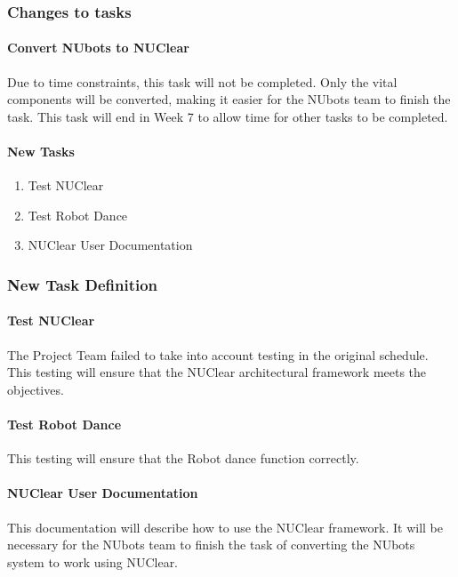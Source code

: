 \documentclass[english,12pt]{scrartcl}
\begin{document}
			\subsubsection{Changes to tasks}
				\paragraph{Convert NUbots to NUClear}
					Due to time constraints, this task will not be completed. Only the vital components will be converted, making it easier for the NUbots team to finish the task.
					This task will end in Week 7 to allow time for other tasks to be completed. 
				\paragraph{New Tasks}
					\begin{enumerate}
						\item Test NUClear
						\item Test Robot Dance
						\item NUClear User Documentation
					\end{enumerate}
			\subsubsection{New Task Definition}
				\paragraph{Test NUClear}
					The Project Team failed to take into account testing in the original schedule. This testing will ensure that the NUClear architectural framework meets the objectives.
				\paragraph{Test Robot Dance}
					This testing will ensure that the Robot dance function correctly.
				\paragraph{NUClear User Documentation}
					This documentation will describe how to use the NUClear framework. It will be necessary for the NUbots team to finish the task of converting the NUbots system to work using NUClear.
					
\end{document}
